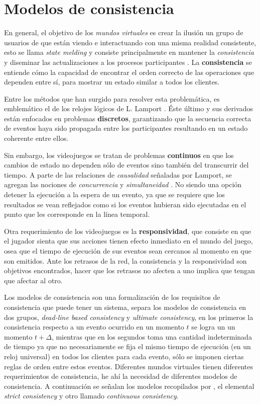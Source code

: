 \section{Modelos de consistencia}

En general, el objetivo de los \emph{mundos virtuales} es crear la ilusión un grupo de usuarios de que están viendo e interactuando con una misma realidad consistente, esto se llama \emph{state melding} y consiste principalmente en mantener la \emph{consistencia} y diseminar las actualizaciones a los procesos participantes \cite{liu2012survey}. La \textbf{consistencia} se entiende cómo la capacidad de encontrar el orden correcto de las operaciones que dependen entre sí, para mostrar un estado similar a todos los clientes.

Entre los métodos que han surgido para resolver esta problemática, es emblemático el de los relojes lógicos de L. Lamport \cite{lamport1978time}. Éste último y sus derivados están enfocados en problemas \textbf{discretos}, garantizando que la secuencia correcta de eventos haya sido propagada entre los participantes resultando en un estado coherente entre ellos.

Sin embargo, los videojuegos se tratan de problemas \textbf{continuos} en que los cambios de estado no dependen sólo de eventos sino también del transcurrir del tiempo. A parte de las relaciones de \emph{causalidad} señaladas por Lamport, se agregan las nociones de \emph{concurrencia} y \emph{simultaneidad} \cite{liu2012survey}. No siendo una opción detener la ejecución a la espera de un evento, ya que se requiere que los resultados se vean reflejados como si los eventos hubieran sido ejecutadas en el punto que les corresponde en la línea temporal\cite{mauve2004local}.

Otra requerimiento de los videojuegos es la \textbf{responsividad}, que consiste en que el jugador sienta que sus acciones tienen efecto inmediato en el mundo del juego, osea que el tiempo de ejecución de sus eventos sean cercanos al momento en que son emitidos. Ante los retrasos de la red, la consistencia y la responsividad son objetivos encontrados, hacer que los retrasos no afecten a uno implica que tengan que afectar al otro.

Los modelos de consistencia son una formalización de los requisitos de consistencia que puede tener un sistema, \cite{liu2012survey} separa los modelos de consistencia en dos grupos, \emph{dead-line based consistency} y \emph{ultimate consistency}, en los primeros la consistencia respecto a un evento ocurrido en un momento $t$ se logra un un momento $t+\Delta$, mientras que en los segundos toma una cantidad indeterminada de tiempo ya que no necesariamente se fija el mismo tiempo de ejecución (en un reloj universal) en todos los clientes para cada evento, sólo se imponen ciertas reglas de orden entre estos eventos. Diferentes mundos virtuales tienen diferentes requerimientos de consistencia, he ahí la necesidad de diferentes modelos de consistencia. A continuación se señalan los modelos recopilados por \cite{liu2012survey}, el elemental \emph{strict consistency} y otro llamado \emph{continuous consistency}.

